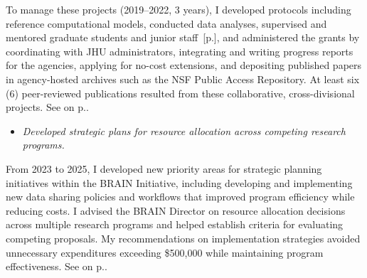 \documentclass[10pt]{article}
\newcommand{\see}[1]{[\textcolor{hopkinsblue}{p.\pageref{sec:#1}}]}
\newcommand{\cf}[1]{\textcolor{hopkinsblue}{See \emph{\nameref{sec:#1}} on p.\pageref{sec:#1}}}
\begin{document}
To manage these projects (2019--2022, 3 years), I developed protocols including
reference computational models, conducted data analyses, supervised and mentored
graduate students and junior staff~\see{mentoring}, and administered the grants
by coordinating with JHU administrators, integrating and writing progress
reports for the agencies, applying for no-cost extensions, and depositing
published papers in agency-hosted archives such as the NSF Public Access
Repository. At least six (6) peer-reviewed publications resulted from these
collaborative, cross-divisional projects. \cf{hadzicpub}.
%

\begin{itemize}
  \color{hopkinsblue}
  \item \emph{Developed strategic plans for resource allocation across competing
research programs.}
\end{itemize}

From 2023 to 2025, I developed new priority areas for strategic planning
initiatives within the BRAIN Initiative, including developing and implementing
new data sharing policies and workflows that improved program efficiency
while reducing costs. I advised the BRAIN Director on resource allocation
decisions across multiple research programs and helped establish criteria for
evaluating competing proposals. My recommendations on implementation strategies
avoided unnecessary expenditures exceeding \$500,000 while maintaining program
effectiveness. \cf{jobobd}.
\end{document}
